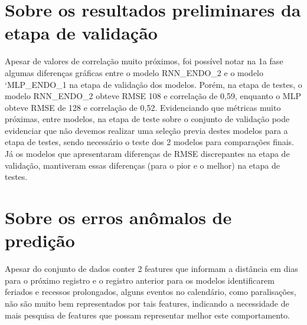    \section{Sobre os resultados preliminares da etapa de validação}
        Apesar de valores de correlação muito próximos, foi possível notar na 1a fase algumas diferenças gráficas entre o modelo RNN\_ENDO\_2 e o modelo `MLP\_ENDO\_1 na etapa de validação dos modelos.  Porém, na etapa de testes, o modelo  RNN\_ENDO\_2 obteve RMSE 108 e correlação de 0,59, enquanto o MLP obteve RMSE de 128 e correlação de 0,52. Evidenciando que métricas muito próximas, entre modelos, na etapa de teste sobre o conjunto de validação pode evidenciar que não devemos realizar uma seleção previa destes modelos para a etapa de testes, sendo necessário o teste dos 2 modelos para comparações finais. Já os modelos que apresentaram diferenças de RMSE discrepantes na etapa de validação, mantiveram essas diferenças (para o pior e o melhor) na etapa de testes.

    \section{Sobre os erros anômalos de predição}
        Apesar do conjunto de dados conter 2 features que informam a distância em dias para o próximo registro e o registro anterior para os modelos identificarem feriados e recessos prolongados, alguns eventos no calendário, como paralisações, não são muito bem representados por tais features, indicando a necessidade de mais pesquisa de features que possam representar melhor este comportamento.


